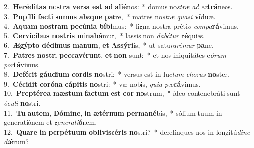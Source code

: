 {2.~}\textbf{He}\textbf{ré}\textbf{di}\textbf{tas} \textbf{no}\textbf{stra} \textbf{ver}\textbf{sa} \textbf{est} \textbf{ad} \textbf{a}\textbf{li}\textbf{é}nos:~* domus no\textit{stræ} \textit{ad} \textit{ex}\textbf{trá}neos.\\
{3.~}\textbf{Pu}\textbf{píl}\textbf{li} \textbf{fa}\textbf{cti} \textbf{su}\textbf{mus} \textbf{ab}s\textbf{que} \textbf{pa}tre,~* matres no\textit{stræ} \textit{qua}\textit{si} \textbf{ví}duæ.\\
{4.~}\textbf{A}\textbf{quam} \textbf{no}\textbf{stram} \textbf{pe}\textbf{cú}\textbf{ni}\textbf{a} \textbf{bí}\textbf{bi}mus:~* ligna nostra préti\textit{o} \textit{com}\textit{pa}\textbf{rá}vimus.\\
{5.~}\textbf{Cer}\textbf{ví}\textbf{ci}\textbf{bus} \textbf{no}\textbf{stris} \textbf{mi}\textbf{na}\textbf{bá}mur,~* lassis non \textit{da}\textit{bá}\textit{tur} \textbf{ré}quies.\\
{6.~}\textbf{Æ}\textbf{gýp}\textbf{to} \textbf{dé}\textbf{di}\textbf{mus} \textbf{ma}\textbf{num}, \textbf{et} \textbf{As}\textbf{sý}\textbf{ri}is,~* ut satu\textit{ra}\textit{ré}\textit{mur} \textbf{pa}ne.\\
{7.~}\textbf{Pa}\textbf{tres} \textbf{no}\textbf{stri} \textbf{pec}\textbf{ca}\textbf{vé}\textbf{runt}, \textbf{et} \textbf{non} sunt:~* et nos iniquitátes e\textit{ó}\textit{rum} \textit{por}\textbf{tá}vimus.\\
{8.~}\textbf{De}\textbf{fé}\textbf{cit} \textbf{gáu}\textbf{di}\textbf{um} \textbf{cor}\textbf{dis} \textbf{no}stri:~* versus est in lu\textit{ctum} \textit{cho}\textit{rus} \textbf{no}ster.\\
{9.~}\textbf{Cé}\textbf{ci}\textbf{dit} \textbf{co}\textbf{ró}\textbf{na} \textbf{cá}\textbf{pi}\textbf{tis} \textbf{no}stri:~* væ nobis, \textit{qui}\textit{a} \textit{pec}\textbf{cá}vimus.\\
{10.~}\textbf{Prop}\textbf{té}\textbf{re}\textbf{a} \textbf{mæ}\textbf{stum} \textbf{fa}\textbf{ctum} \textbf{est} \textbf{cor} \textbf{no}strum,~* ídeo contenebráti sunt \textit{ó}\textit{cu}\textit{li} \textbf{no}stri.\\
{11.~}\textbf{Tu} \textbf{au}\textbf{tem}, \textbf{Dó}\textbf{mi}\textbf{ne}, \textbf{in} \textbf{æ}\textbf{tér}\textbf{num} \textbf{per}\textbf{ma}\textbf{né}bis,~* sólium tuum in generatiónem et ge\textit{ne}\textit{ra}\textit{ti}\textbf{ó}nem.\\
{12.~}\textbf{Qua}\textbf{re} \textbf{in} \textbf{per}\textbf{pé}\textbf{tu}\textbf{um} \textbf{o}\textbf{bli}\textbf{vi}\textbf{scé}\textbf{ris} \textbf{no}stri?~* derelínques nos in longitú\textit{di}\textit{ne} \textit{di}\textbf{é}rum?\\
